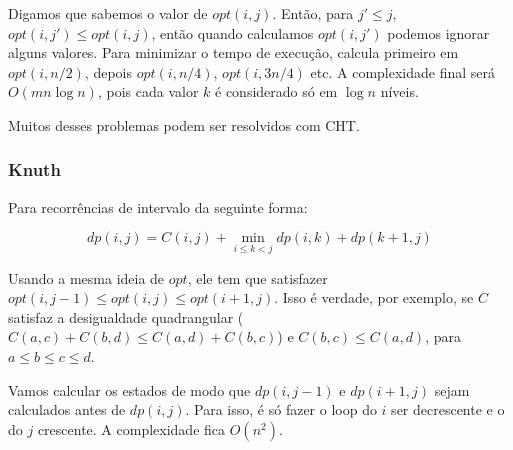 Digamos que sabemos o valor de $opt(i, j)$. Então, para $j' \le j$, $opt(i, j') \le opt(i, j)$, então quando calculamos $opt(i, j')$ podemos ignorar alguns valores. Para minimizar o tempo de execução, calcula primeiro em $opt(i, n/2)$, depois $opt(i, n/4)$, $opt(i, 3n/4)$ etc. A complexidade final será $O (mn \log n)$, pois cada valor $k$ é considerado só em $\log n$ níveis.

Muitos desses problemas podem ser resolvidos com CHT.


\subsubsection{Knuth}

Para recorrências de intervalo da seguinte forma:

\begin{equation*}
    dp(i, j) = C(i, j) + \min_{i \le k < j} dp(i, k) + dp(k+1, j)
\end{equation*}

Usando a mesma ideia de $opt$, ele tem que satisfazer $opt(i, j-1) \le opt(i, j) \le opt(i+1,j)$. Isso é verdade, por exemplo, se $C$ satisfaz a desigualdade quadrangular ($C(a, c) + C(b, d) \le C(a, d) + C(b, c)$) e $C(b, c) \le C(a, d)$, para $a \le b \le c \le d$.
 
Vamos calcular os estados de modo que $dp(i, j-1)$ e $dp(i+1, j)$ sejam calculados antes de $dp(i, j)$. Para isso, é só fazer o loop do $i$ ser decrescente e o do $j$ crescente. A complexidade fica $O(n^2)$.


